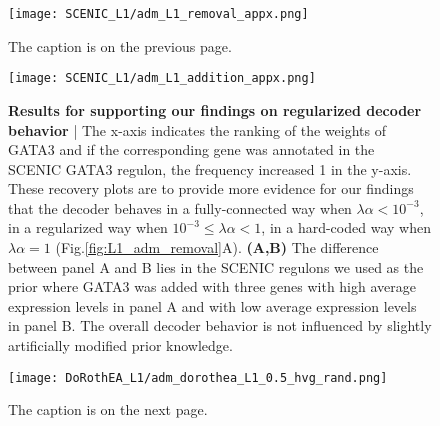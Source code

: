 \addtocounter{figure}{-1}
\begin{figure}[h!]
    \centering
    \texttt{[image: SCENIC\_L1/adm\_L1\_removal\_appx.png]}
    \caption{\small{The caption is on the previous page.}}
    \label{fig:L1_adm_removal_appx}
\end{figure}

\begin{figure}[h!]
    \centering
    \texttt{[image: SCENIC\_L1/adm\_L1\_addition\_appx.png]}
    \caption{\small{\textbf{Results for supporting our findings on regularized decoder behavior} | The x-axis indicates the ranking of the weights of GATA3 and if the corresponding gene was annotated in the SCENIC GATA3 regulon, the frequency increased 1 in the y-axis. These recovery plots are to provide more evidence for our findings that the decoder behaves in a fully-connected way when $\lambda\alpha < 10^{-3}$, in a regularized way when $10^{-3} \leq \lambda\alpha <1$, in a hard-coded way when $\lambda\alpha = 1$ (Fig.\ref{fig:L1_adm_removal}A). \textbf{(A,B)} The difference between panel A and B lies in the SCENIC regulons we used as the prior where GATA3 was added with three genes with high average expression levels in panel A and with low average expression levels in panel B. The overall decoder behavior is not influenced by slightly artificially modified prior knowledge.}}
    \label{fig:L1_adm_addition_appx}
\end{figure}

\begin{figure}[h!]
    \centering
    \hspace*{-5mm}
    \texttt{[image: DoRothEA\_L1/adm\_dorothea\_L1\_0.5\_hvg\_rand.png]}
    \caption{\small{The caption is on the next page.}}
    \label{fig:L1_adm_dorothea_rand_0.5_hvg}
\end{figure}

